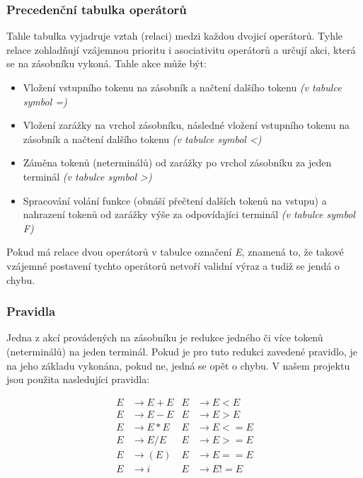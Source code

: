 \documentclass[a4paper,11pt]{article}
\begin{document}
\subsubsection{Precedenční tabulka operátorů}
Tahle tabulka vyjadruje vztah (relaci) medzi každou dvojicí operátorů. Tyhle relace zohladňují vzájemnou prioritu i asociativitu operátorů a určují akci, která se na zásobníku vykoná. Tahle akce může být: 
\begin{itemize}
   \item Vložení vstupního tokenu na zásobník a načtení dalšího tokenu \textit{(v tabulce symbol =)}
   \item Vložení zarážky na vrchol zásobníku, následné vložení vstupního tokenu na zásobník a načtení dalšího tokenu \textit{(v tabulce symbol \textless)}
   \item Záměna tokenů (neterminálů) od zarážky po vrchol zásobníku za jeden terminál \textit{(v tabulce symbol \textgreater)}
   \item Spracování volání funkce (obnáší přečtení dalších tokenů na vstupu) a nahrazení tokenů od zarážky výše za odpovídajíci terminál \textit{(v tabulce symbol F)}
\end{itemize}

Pokud má relace dvou operátorů v tabulce označení \textit{E}, znamená to, že takové vzájemné postavení tychto operátorů netvoří validní výraz a tudiž se jendá o chybu.

\subsubsection{Pravidla}
Jedna z akcí provádených na zásobníku je redukce jedného či více tokenů (neterminálů) na jeden terminál. Pokud je pro tuto redukci zavedené pravidlo, je na jeho základu vykonána, pokud ne, jedná se opět o chybu. V našem projektu jsou použita nasledujíci pravidla:

\begin{align*}
E &\rightarrow E + E  &   E &\rightarrow E < E\\
E &\rightarrow E - E  &   E &\rightarrow E > E\\
E &\rightarrow E * E  &   E &\rightarrow E <= E\\
E &\rightarrow E / E  &   E &\rightarrow E >= E\\
E &\rightarrow ( E )  &   E &\rightarrow E == E\\
E &\rightarrow i      &   E &\rightarrow E != E\\
\end{align*}
\end{document}

